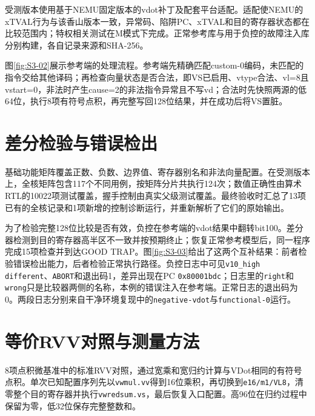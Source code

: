受测版本使用基于NEMU固定版本的vdot补丁及配套平台适配。适配使NEMU的xTVAL行为与该香山版本一致，异常码、陷阱PC、xTVAL和目的寄存器状态都在比较范围内；特权相关测试在M模式下完成。正常参考库与用于负控的故障注入库分别构建，各自记录来源和SHA-256。

图\ref{fig:S3-02}展示参考端的处理流程。参考端先精确匹配custom-0编码，未匹配的指令交给其他译码；再检查向量状态是否合法，即VS已启用、vtype合法、vl=8且vstart=0，非法时产生cause=2的非法指令异常且不写vd；合法时先快照两源的低64位，执行8项有符号点积，再完整写回128位结果，并在成功后将VS置脏。


\section{差分检验与错误检出}\label{sec:3-diff}
基础功能矩阵覆盖正数、负数、边界值、寄存器别名和非法向量配置。在受测版本上，全核矩阵包含117个不同用例，按矩阵分片共执行124次；数值正确性由算术RTL的10022项测试覆盖，握手控制由真实父级测试覆盖。最终验收时汇总了13项已有的全核记录和1项新增的控制诊断运行，并重新解析了它们的原始输出。

为了检验完整128位比较是否有效，负控在参考端的vdot结果中翻转bit100。差分器检测到目的寄存器高半区不一致并按预期终止；恢复正常参考模型后，同一程序完成15项检查并到达GOOD TRAP。图\ref{fig:S3-03}给出了这两个互补结果：前者检验错误检出能力，后者检验正常执行路径。负控日志中可见\texttt{v10\_high different}、\texttt{ABORT}和退出码1，差异出现在PC \texttt{0x80001bdc}；日志里的\texttt{right}和\texttt{wrong}只是比较器两侧的名称，本例的错误注入在参考端。正常日志的退出码为0。两段日志分别来自干净环境复现中的\texttt{negative-vdot}与\texttt{functional-0}运行。




\section{等价RVV对照与测量方法}
8项点积微基准中的标准RVV对照，通过宽乘和宽归约计算与VDot相同的有符号点积。单次已知配置序列先以\texttt{vwmul.vv}得到16位乘积，再切换到\texttt{e16/m1/VL8}，清零整个目的寄存器并执行\texttt{vwredsum.vs}，最后恢复入口配置。高96位在归约过程中保留为零，低32位保存完整整数和。

